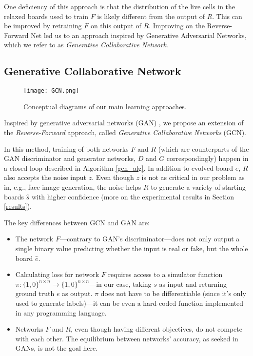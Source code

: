 \documentclass[conference]{IEEEtran}
\begin{document}
One deficiency of this approach is that the distribution of the live cells in the relaxed boards used to train $F$ is likely different from the output of $R$. This can be improved by retraining $F$ on this output of $R$. Improving on the Reverse-Forward Net led us to an approach inspired by Generative Adversarial Networks, which we refer to as \emph{Generative Collaborative Network}.

\subsection{Generative Collaborative Network}
\label{gcn}

\begin{figure}
    \centering
\texttt{[image: GCN.png]}
    \caption{Conceptual diagrams of our main learning approaches.}
    \label{fig:algo_concepts}
\end{figure}

Inspired by generative adversarial networks (GAN) \cite{goodfellow2014generative}, we propose an extension of the \emph{Reverse-Forward} approach, called \emph{Generative Collaborative Networks} (GCN).

In this method, training of both networks $F$ and $R$ (which are counterparts of the GAN discriminator and generator networks, $D$ and $G$ correspondingly) happen in a closed loop described in Algorithm \ref{gcn_alg}. In addition to evolved board $e$, $R$ also accepts the noise input $z$. Even though $z$ is not as critical in our problem as in, e.g., face image generation, the noise helps $R$ to generate a variety of starting boards $\hat s$ with higher confidence (more on the experimental results in Section \ref{results}). 

The key differences between GCN and GAN are:
\begin{itemize}
    \item The network $F$---contrary to GAN's discriminator---does not only output a single binary value predicting whether the input is real or fake, but the whole board $\hat e$.
    \item Calculating loss for network $F$ requires access to a simulator function $\pi \colon \{1,0\}^{n\times n} \rightarrow \{1,0\}^{n\times n}$---in our case, taking $s$ as input and returning ground truth $e$ as output. $\pi$ does not have to be differentiable (since it's only used to generate labels)---it can be even a hard-coded function implemented in any programming language.
    \item Networks $F$ and $R$, even though having different objectives, do not compete with each other. The equilibrium between networks' accuracy, as seeked in GANs, is not the goal here.
\end{itemize}
\end{document}
